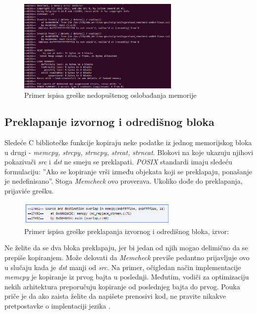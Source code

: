 \documentclass[12pt,oneside]{memoir}
\theoremstyle{plain}
\theoremstyle{definition}
\begin{document}
\begin{figure}[!ht]
  \centering
  \includegraphics[width=0.7\textwidth]{invalidFreeError.png}
  \caption{Primer ispisa greške nedopuštenog oslobađanja memorije}
  \label{fig:slika2.9}
\end{figure}

\subsection{Preklapanje izvornog i odredišnog bloka}
Sledeće C bibliotečke funkcije kopiraju neke podatke iz jednog memorijskog bloka u drugi - \textit{memcpy, strcpy, strncpy, strcat, strncat}.  Blokovi na koje ukazuju njihovi pokazivači \textit{src} i \textit{dst} ne smeju se preklapati. \textit{POSIX} standardi imaju sledeću formulaciju: ''Ako se kopiranje vrši između objekata koji se preklapaju, ponašanje je nedefinisano''.  Stoga \textit{Memcheck} ovo proverava. Ukoliko dođe do preklapanja, prijaviće grešku.
\begin{figure}[!ht]
  \centering
  \includegraphics[width=0.7\textwidth]{overlapError.png}
  \caption{Primer ispisa greške preklapanja izvornog i odredišnog bloka, izvor: \cite{Memcheck}}
  \label{fig:slika2.10}
\end{figure}
Ne želite da se dva bloka preklapaju, jer bi jedan od njih mogao delimično da se prepiše kopiranjem. Može delovati da \textit{Memcheck} previše pedantno prijavljuje ovo u slučaju kada je \textit{dst} manji od \textit{src}. Na primer, očigledan način implementacije \textit{memcpy}  je kopiranje iz prvog bajta u poslednji. Međutim, vodiči za optimizaciju nekih arhitektura preporučuju kopiranje od poslednjeg bajta do prvog. Pouka priče je da ako zaista želite da napišete prenosivi kod, ne pravite nikakve pretpostavke o implentaciji jezika \cite{Memcheck}. 
\end{document}
